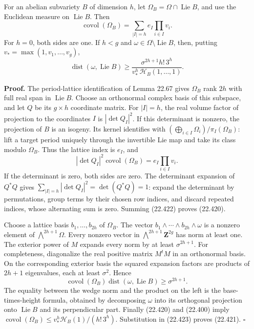 \documentclass[
  11pt,
  a4paper,
]{article}
\begin{document}
For an abelian subvariety \(B\) of dimension \(h\), let
\(\Omega_B=\Omega\cap\operatorname{Lie}B\), and use the Euclidean
measure on \(\operatorname{Lie}B\). Then \[
 \operatorname{covol}(\Omega_B)
      =\sum_{|I|=h}e_I\prod_{i\in I}v_i.
 \tag{22.420}
\] For \(h=0\), both sides are one. If \(h<g\) and
\(\omega\in\Omega\setminus\operatorname{Lie}B\), then, putting
\(v_*=\max(1,v_1,\ldots,v_g)\), \[
 \operatorname{dist}(\omega,\operatorname{Lie}B)
 \ge\frac{\sigma^{2h+1}h!\,3^h}
              {v_*^h\,\mathcal H_B(1,\ldots,1)}.
 \tag{22.421}
\]

\textbf{Proof.} The period-lattice identification of Lemma 22.67 gives
\(\Omega_B\) rank \(2h\) with full real span in \(\operatorname{Lie}B\).
Choose an orthonormal complex basis of this subspace, and let \(Q\) be
its \(g\times h\) coordinate matrix. For \(|I|=h\), the real volume
factor of projection to the coordinates \(I\) is \(|\det Q_I|^2\). If
this determinant is nonzero, the projection of \(B\) is an isogeny. Its
kernel identifies with \((\bigoplus_{i\in I}\Omega_i)/\pi_I(\Omega_B)\):
lift a target period uniquely through the invertible Lie map and take
its class modulo \(\Omega_B\). Thus the lattice index is \(e_I\), and \[
 |\det Q_I|^2\operatorname{covol}(\Omega_B)
                       =e_I\prod_{i\in I}v_i.
 \tag{22.422}
\] If the determinant is zero, both sides are zero. The determinant
expansion of \(Q^*Q\) gives \(\sum_{|I|=h}|\det Q_I|^2=\det(Q^*Q)=1\):
expand the determinant by permutations, group terms by their chosen row
indices, and discard repeated indices, whose alternating sum is zero.
Summing (22.422) proves (22.420).

Choose a lattice basis \(b_1,\ldots,b_{2h}\) of \(\Omega_B\). The vector
\(b_1\wedge\cdots\wedge b_{2h}\wedge\omega\) is a nonzero element of
\(\bigwedge^{2h+1}\Omega\). Every nonzero vector in
\(\bigwedge^{2h+1}\mathbf Z^{2g}\) has norm at least one. The exterior
power of \(M\) expands every norm by at least \(\sigma^{2h+1}\). For
completeness, diagonalize the real positive matrix \(M^tM\) in an
orthonormal basis. On the corresponding exterior basis the squared
expansion factors are products of \(2h+1\) eigenvalues, each at least
\(\sigma^2\). Hence \[
 \operatorname{covol}(\Omega_B)
       \operatorname{dist}(\omega,\operatorname{Lie}B)
       \ge \sigma^{2h+1}.
 \tag{22.423}
\] The equality between the wedge norm and the product on the left is
the base-times-height formula, obtained by decomposing \(\omega\) into
its orthogonal projection onto \(\operatorname{Lie}B\) and its
perpendicular part. Finally (22.420) and (22.400) imply
\(\operatorname{covol}(\Omega_B)\le
v_*^h\mathcal H_B(1)/(h!\,3^h)\). Substitution in (22.423) proves
(22.421). \(\square\)
\end{document}
